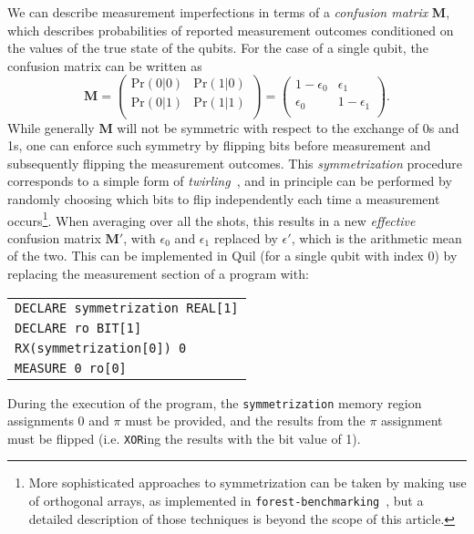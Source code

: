 \documentclass[12pt]{iopart}
\begin{document}
We can describe measurement imperfections in terms of a \textit{confusion matrix} 
\textbf{M}, which describes probabilities of reported measurement outcomes 
conditioned on the values of the true state of the qubits. For the case of a single 
qubit, the confusion matrix can be written as
\begin{equation}
\textbf{M} = \begin{pmatrix}
           \text{Pr}(0|0) & \text{Pr}(1|0) \\
            \text{Pr}(0|1) & \text{Pr}(1|1) \\
            \end{pmatrix}
         = \begin{pmatrix}
            1 - \epsilon_0 & \epsilon_1\\
            \epsilon_0 & 1 - \epsilon_1 \\
            \end{pmatrix}.
\end{equation}
While generally $\textbf{M}$ will not be symmetric with respect to the exchange of 0s 
and 1s, one can enforce such symmetry by flipping bits before measurement and 
subsequently flipping the measurement outcomes. This {\em symmetrization} procedure 
corresponds to a simple form of {\em twirling}~\cite{Bennet1996,Bartlett2007}, and in principle can be performed by randomly choosing which bits to 
flip independently each time a measurement occurs\footnote{More sophisticated 
approaches to symmetrization can be taken by making use of orthogonal arrays, as 
implemented in {\tt forest-benchmarking}~\cite{ForestBenchmarking}, but a detailed 
description of those techniques is beyond the scope of this article.}.
When averaging  over all the shots, this results in a new \textit{effective} confusion matrix $\textbf{M}'$, with $\epsilon_0$ and $\epsilon_1$ replaced by $\epsilon'$, 
which is the arithmetic mean of the two. This can be implemented in Quil (for a single qubit with index 0) by replacing the measurement section of a program with:
\begin{center}
\begin{tabular}{l}
\verb|DECLARE symmetrization REAL[1]|\\
\verb|DECLARE ro BIT[1]|\\
\verb|RX(symmetrization[0]) 0|\\
\verb|MEASURE 0 ro[0]|\\
\end{tabular}
\end{center}
During the execution of the program, the \texttt{symmetrization} memory region assignments $0$ and $\pi$ must be provided, and the results from the $\pi$ assignment must be flipped (i.e. \texttt{XOR}ing the results with the bit value of 1).
\end{document}
